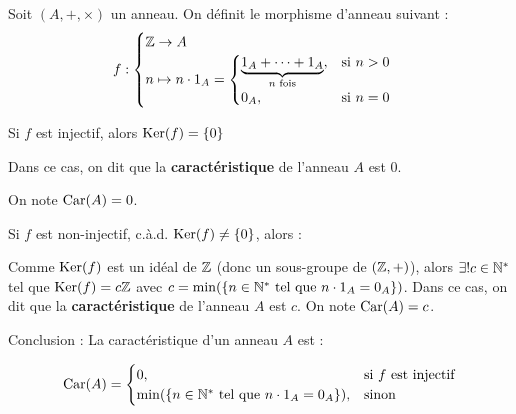 \documentclass[12pt, a4paper]{report}
\begin{document}
\begin{definition}
    Soit $(A,+,\times)$ un anneau. On définit le morphisme d'anneau suivant :
    $$f:\begin{cases}\mathbb{Z}\to A\\
        n \mapsto n\cdot 1_A = \begin{cases}
        \underbrace{1_A + \cdots + 1_A}_{n \text{ fois}}, & \text{si } n > 0\\
        0_A, & \text{si } n = 0\\
        \end{cases}
    \end{cases}$$
    \begin{outline}
    \1 Si $f$ est injectif, alors $\mathrm{Ker}(f) = \{0\}$

        \2 Dans ce cas, on dit que la \textbf{caractéristique} de l'anneau $A$ est $0$.

        \2 On note $\mathrm{Car}(A) = 0$.

    \1 Si $f$ est non-injectif, c.à.d. $\mathrm{Ker}(f) \neq \{0\}$, alors :

        \2 Comme $\mathrm{Ker}(f)$ est un idéal de $\mathbb{Z}$ (donc un sous-groupe de $(\mathbb{Z},+)$), alors $\exists! c \in \mathbb{N}^*$ tel que $\mathrm{Ker}(f) = c\mathbb{Z}$ avec $c = \min(\{n\in\mathbb{N}^*\text{ tel que } n\cdot1_A = 0_A\})$.
        \2 Dans ce cas, on dit que la \textbf{caractéristique} de l'anneau $A$ est $c$.
        \2 On note $\mathrm{Car}(A) = c$.

    \1 Conclusion : La caractéristique d'un anneau $A$ est :

    $$\mathrm{Car}(A) = \begin{cases}
    0, & \text{si } f \text{ est injectif}\\
    \min(\{n\in\mathbb{N}^*\text{ tel que } n\cdot1_A = 0_A\}), & \text{sinon}
    \end{cases}$$
    \end{outline}

\end{definition}
\end{document}
